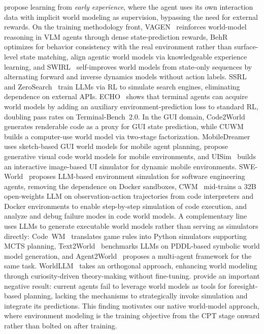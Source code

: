 \citet{zhang2025agent} propose learning from \emph{early experience}, where the agent uses its own interaction data with implicit world modeling as supervision, bypassing the need for external rewards.
On the training methodology front, VAGEN~\citep{wang2026vagen} reinforces world-model reasoning in VLM agents through dense state-prediction rewards, BehR~\citep{huang2026beyond} optimizes for behavior consistency with the real environment rather than surface-level state matching, \citet{ren2026aligning} align agentic world models via knowledgeable experience learning, and SWIRL~\citep{qiu2026self} self-improves world models from state-only sequences by alternating forward and inverse dynamics models without action labels.
SSRL~\citep{fan2025ssrl} and ZeroSearch~\citep{sun2025zerosearch} train LLMs via RL to simulate search engines, eliminating dependence on external APIs.
ECHO~\citep{shrivastava2026echo} shows that terminal agents can acquire world models by adding an auxiliary environment-prediction loss to standard RL, doubling pass rates on Terminal-Bench~2.0.
In the GUI domain, Code2World~\citep{zheng2026code2world} generates renderable code as a proxy for GUI state prediction, while CUWM~\citep{guan2026computer} builds a computer-use world model via two-stage factorization.
MobileDreamer~\citep{cao2026mobiledreamer} uses sketch-based GUI world models for mobile agent planning, \citet{koh2026generative} propose generative visual code world models for mobile environments, and UISim~\citep{xiang2025uisim} builds an interactive image-based UI simulator for dynamic mobile environments.
SWE-World~\citep{sun2026swe} proposes LLM-based environment simulation for software engineering agents, removing the dependence on Docker sandboxes, CWM~\citep{copet2025cwm} mid-trains a 32B open-weights LLM on observation-action trajectories from code interpreters and Docker environments to enable step-by-step simulation of code execution, and \citet{rahmani2026debugging} analyze and debug failure modes in code world models.
A complementary line uses LLMs to generate executable world models rather than serving as simulators directly: Code~WM~\citep{lehrach2025code} translates game rules into Python simulators supporting MCTS planning, Text2World~\citep{hu2025text2world} benchmarks LLMs on PDDL-based symbolic world model generation, and Agent2World~\citep{hu2025agent2world} proposes a multi-agent framework for the same task.
WorldLLM~\citep{levy2025worldllm} takes an orthogonal approach, enhancing world modeling through curiosity-driven theory-making without fine-tuning.
\citet{qian2026current} provide an important negative result: current agents fail to leverage world models as tools for foresight-based planning, lacking the mechanisms to strategically invoke simulation and integrate its predictions.
This finding motivates our native world-model approach, where environment modeling is the training objective from the CPT stage onward rather than bolted on after training.

